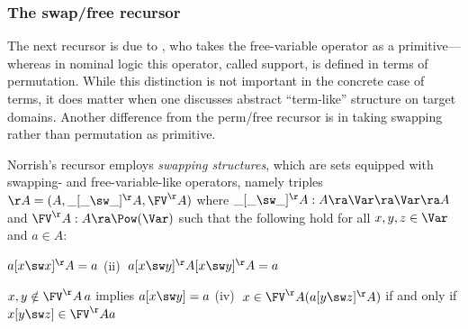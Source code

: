 

\subsubsection{The swap/free recursor} %
\label{subsubsec-freeSwapRec}
%
The next recursor is due to %
\citet{primrecFOAS-Norrish04}, who 
takes the free-variable operator as a primitive---whereas in nominal logic this operator, called support, is defined in terms of permutation. While this distinction is not important in the concrete case of terms, it does matter when one discusses abstract ``term-like'' %
structure on target domains. 
%
Another %
difference from the perm/free recursor is in taking swapping rather than permutation as primitive.%

Norrish's recursor employs 
\emph{swapping structures}, which are sets equipped with swapping- and free-variable-like operators, namely triples $\AA = (A,\_[\_\sw\_]^\AA,\FV^\AA)$ where 
$\_[\_\sw\_]^\AA : A \ra \Var \ra \Var \ra A$ and 
$\FV^\AA : A \ra \Pow(\Var)$
such that 
the following hold for all $x,y,z \in \Var$ and $a\in A$:
\begin{myitem}
	\item[(i)] $a[x \sw x]^\AA =a$
	\hspace*{22.2ex} (ii) $\;a[x \sw y]^\AA [x \sw y]^\AA = a$
	\item[(iii)]  $x,y\notin \FV^\AA\,a$ implies $a[x \sw y] = a$
\hspace*{4.53ex} (iv) $\;x\in \FV^\AA(a[y\sw z]^\AA)$ if and only if $x[y\sw z] \in \FV^\AA a$
\end{myitem}


